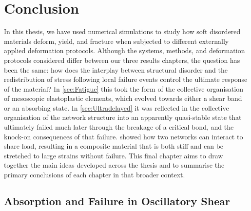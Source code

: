 \documentclass[asymmetricmargins]{library/duthesis}%
\begin{document}
\setcounter{equation}{0}
\chapter{Conclusion}
In this thesis, we have used numerical simulations to study how soft disordered materials deform, yield, and fracture when subjected to different externally applied deformation protocols. Although the systems, methods, and deformation protocols considered differ between our three results chapters, the question has been the same: how does the interplay between structural disorder and the redistribution of stress following local failure events control the ultimate response of the material? In \cref{sec:Fatigue} this took the form of the collective organisation of mesoscopic elastoplastic elements, which evolved towards either a shear band or an absorbing state. In \cref{sec:Ultradelayed} it was reflected in the collective organisation of the network structure into an apparently quasi-stable state that ultimately failed much later through the breakage of a critical bond, and the knock-on consequences of that failure.  showed how two networks can interact to share load, resulting in a composite material that is both stiff and can be stretched to large strains without failure. This final chapter aims to draw together the main ideas developed across the thesis and to summarise the primary conclusions of each chapter in that broader context.

\section*{Absorption and Failure in Oscillatory Shear}

\end{document}
